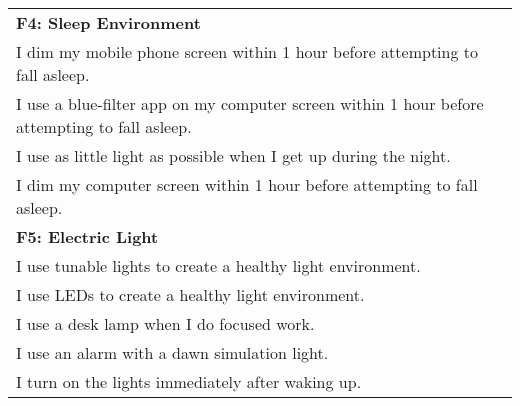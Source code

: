 \documentclass[
  english,
  man,floatsintext]{apa6}
\begin{document}
\begin{longtable}[]{@{}
  >{\raggedright\arraybackslash}p{}@{}}
\textbf{F4: Sleep Environment} \\
I dim my mobile phone screen within 1 hour before attempting to fall asleep. \\
I use a blue-filter app on my computer screen within 1 hour before attempting to fall asleep. \\
I use as little light as possible when I get up during the night. \\
I dim my computer screen within 1 hour before attempting to fall asleep. \\
\textbf{F5: Electric Light} \\
I use tunable lights to create a healthy light environment. \\
I use LEDs to create a healthy light environment. \\
I use a desk lamp when I do focused work. \\
I use an alarm with a dawn simulation light. \\
I turn on the lights immediately after waking up. \\
\bottomrule
\end{longtable}

\newpage
\end{document}
